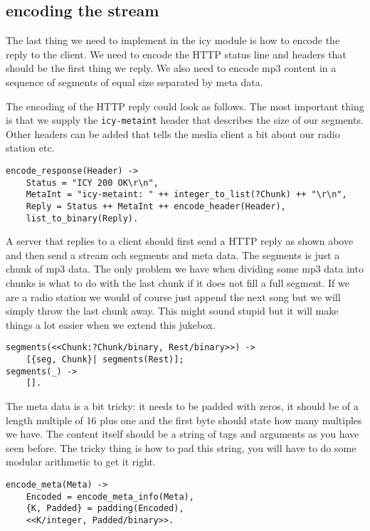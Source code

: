 \documentclass[a4paper,dvips,11pt]{article}
\begin{document}
\subsection{encoding the stream}

The last thing we need to implement in the icy module is how to encode
the reply to the client. We need to encode the HTTP status line and
headers that should be the first thing we reply. We also need to
encode mp3 content in a sequence of segments of equal size separated
by meta data.

The encoding of the HTTP reply could look as follows. The most
important thing is that we supply the {\tt icy-metaint} header that
describes the size of our segments. Other headers can be added that
tells the media client a bit about our radio station etc.

\begin{verbatim}
encode_response(Header) ->
    Status = "ICY 200 OK\r\n",
    MetaInt = "icy-metaint: " ++ integer_to_list(?Chunk) ++ "\r\n",
    Reply = Status ++ MetaInt ++ encode_header(Header),
    list_to_binary(Reply).
\end{verbatim}

A server that replies to a client should first send a HTTP reply as
shown above and then send a stream och segments and meta data. The
segments is just a chunk of mp3 data. The only problem we have when
dividing some mp3 data into chunks is what to do with the last chunk
if it does not fill a full segment. If we are a radio station we would
of course just append the next song but we will simply throw the last
chunk away. This might sound stupid but it will make things a lot
easier when we extend this jukebox.

\begin{verbatim}
segments(<<Chunk:?Chunk/binary, Rest/binary>>) ->
    [{seg, Chunk}| segments(Rest)];
segments(_) ->
    [].
\end{verbatim}

The meta data is a bit tricky: it needs to be padded with zeros, it
should be of a length multiple of 16 plus one and the first byte
should state how many multiples we have. The content itself should be
a string of tags and arguments as you have seen before. The tricky
thing is how to pad this string, you will have to do some modular
arithmetic to get it right.

\begin{verbatim}
encode_meta(Meta) ->
    Encoded = encode_meta_info(Meta),
    {K, Padded} = padding(Encoded),
    <<K/integer, Padded/binary>>.    
\end{verbatim}
\end{document}
